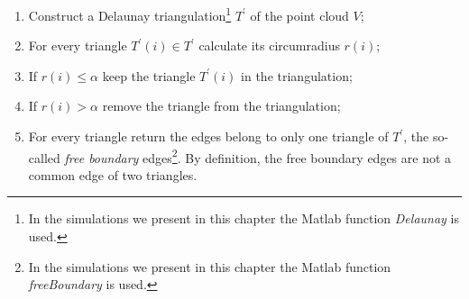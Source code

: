 \begin{enumerate}
\item Construct a Delaunay triangulation\footnote{In the simulations we present in this chapter the Matlab function \textit{Delaunay} is used.} $T^\prime$ of the point cloud $V$;
\item For every triangle $T^\prime(i)\in T^\prime$ calculate its circumradius $r(i)$;
\item If $r(i)\leq\alpha$ keep the triangle $T^\prime(i)$ in the triangulation;
\item If $r(i)>\alpha$ remove the triangle from the triangulation;
\item For every triangle return the edges belong to only one triangle of $T^{\prime}$, the so-called \textit{free boundary} edges\footnote{In the simulations we present in this chapter the Matlab function \textit{freeBoundary} is used.}. By definition, the free boundary edges are not a common edge of two triangles.
\end{enumerate}
